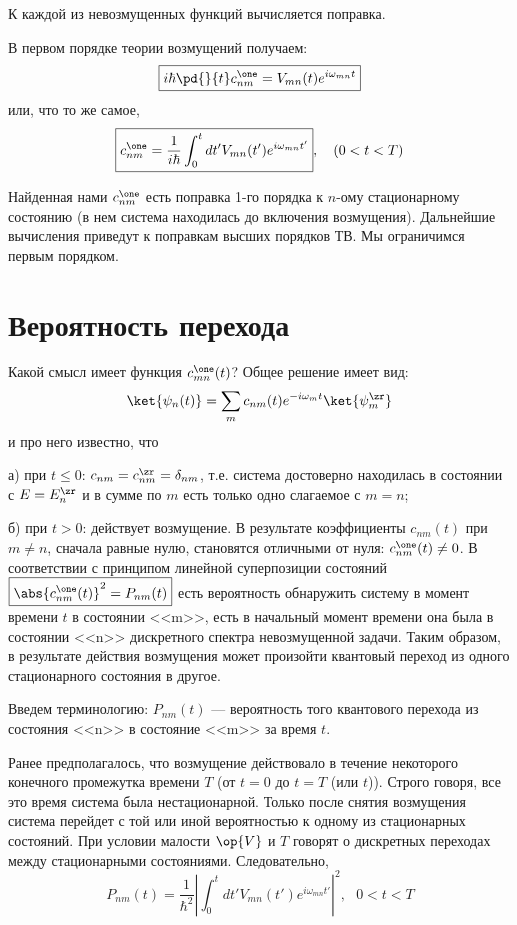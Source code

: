 К каждой из невозмущенных функций вычисляется поправка.

В первом порядке теории возмущений получаем:
\begin{equation}
\label{eq:13_1_5}
\boxed{i \hbar \pd{}{t} c_{nm}^\one = V_{mn}(t) e^{i \omega_{mn} t}}
\end{equation} 
или, что то же самое,
\begin{equation*}
\boxed{c_{nm}^\one = \frac{1}{i\hbar} \int_0^t dt' V_{mn}(t') e^{i \omega_{mn} t'}}, ~~~(0 < t < T)
\end{equation*}

Найденная нами $c_{nm}^\one$ есть поправка 1-го порядка к $n$-ому стационарному состоянию (в нем система находилась до включения возмущения). Дальнейшие вычисления приведут к поправкам высших порядков ТВ. Мы ограничимся первым порядком.

\section{Вероятность перехода}

Какой смысл имеет функция $c_{mn}^\one (t)$? Общее решение имеет вид:
$$
\ket{\psi_n(t)} = \sum_m c_{nm}(t) e^{-i \omega_m t} \ket{\psi_m^\zr}
$$
и про него известно, что

а) при $t \le 0$: $c_{nm} = c_{nm}^\zr = \delta_{nm}$, т.е. система достоверно находилась в состоянии с $E=E_n^\zr$ и в сумме по $m$ есть только одно слагаемое с $m = n$;

б) при $t > 0$: действует возмущение. В результате коэффициенты $c_{nm}(t)$ при $m \neq n$, сначала равные нулю, становятся отличными от нуля: $c_{nm}^\one(t) \neq 0$. В соответствии с принципом линейной суперпозиции состояний $\boxed{\abs{c_{nm}^\one (t)}^2 = P_{nm}(t)}$ есть вероятность обнаружить систему в момент времени $t$ в состоянии <<m>>, есть в начальный момент времени она была в состоянии <<n>> дискретного спектра невозмущенной задачи. Таким образом, в результате действия возмущения может произойти квантовый переход из одного стационарного состояния в другое.

Введем терминологию: $P_{nm}(t)$ --- вероятность того квантового перехода из состояния <<n>> в состояние <<m>> за время $t$. 

Ранее предполагалось, что возмущение действовало в течение некоторого конечного промежутка времени $T$ (от $t = 0$ до $t = T$ (или $t$)). Строго говоря, все это время система была нестационарной. Только после снятия возмущения система перейдет с той или иной вероятностью к одному из стационарных состояний. При условии малости $\op{V}$ и $T$ говорят о дискретных переходах между стационарными состояниями. Следовательно,  
$$
P_{nm}(t) =\frac{1}{\hbar^2} \left | \int_0^t dt' V_{mn}(t') e^{i \omega_{mn} t'} \right |^2, ~~~0 < t < T
$$

